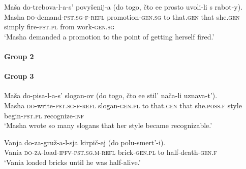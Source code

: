 \documentclass[output=paper,colorlinks,citecolor=brown,modfonts,nonflat]{langsci/langscibook}
\begin{document}
\ea%
    \label{ex:antonyuk:30}
    \gll    Maša do-trebova-l-a-s’ povyšenij-a (do togo, čto ee prosto uvoli-li s rabot-y).\\
            Masha \textsc{do-}demand\textsc{-pst.sg-f-refl} promotion\textsc{-gen.sg} to that\textsc{.gen} that she\textsc{.gen} simply fire\textsc{-pst.pl} from work\textsc{-gen.sg}\\
    \glt    `Masha demanded a promotion to the point of getting herself fired.'
    \z

\paragraph*{Group 2}

\ea[*]{%
    \label{ex:antonyuk:31}
    \gll    Maša do-ugošč-a-l-a-s’ podrug (do togo, čto vse popa-li v reanimacij-u).\\
            Masha \textsc{do-}treat\textsc{-ind-pst.sg-f-refl} friend\textsc{.gen.pl} \hspaceThis{[}to that\textsc{.gen} that all get\textsc{-pst.pl} in ICU\textsc{-p.f}\\
    \glt    `Masha treated her girlfriends to the point of everyone ending up in ICU.'}
    \z

\ea[*]{%
    \label{ex:antonyuk:32}
    \gll    Maša do-obiž-a-l-a-s’ druz-ej (do togo, čto o-sta-la-s’ odn-a).\\
            Masha \textsc{do-}insult\textsc{-ind-pst.sg-f-refl} friend\textsc{-gen.pl} \hspaceThis{[}to that\textsc{.gen} that \textsc{o-}remain\textsc{-pst.sg.f-refl} alone\textsc{-sg.f}\\
    \glt    `Masha kept insulting friends to the point that she had noone left.'}
    \z

\paragraph*{Group 3}

\ea%
    \label{ex:antonyuk:33}
    \gll    Maša do-pisa-l-a-s’ slogan-ov (do togo, čto ee stil’ nača-li uznava-t’).\\
            Masha \textsc{do-}write\textsc{-pst.sg-f-refl} slogan\textsc{-gen.pl} \hspaceThis{[}to that\textsc{.gen} that she\textsc{.poss.f} style begin\textsc{-pst.pl} recognize\textsc{-inf}\\
    \glt    `Masha wrote so many slogans that her style became recognizable.'
    \z

\ea%
    \label{ex:antonyuk:34}
    \gll    Vanja do-za-gruž-a-l-sja kirpič-ej (do polu-smert’-i).\\
            Vania \textsc{do-za-}load\textsc{-ipfv-pst.sg.m-refl} brick\textsc{-gen.pl} \hspaceThis{[}to half-death\textsc{-gen.f}\\
    \glt    `Vania loaded bricks until he was half-alive.'
    \z
\end{document}
